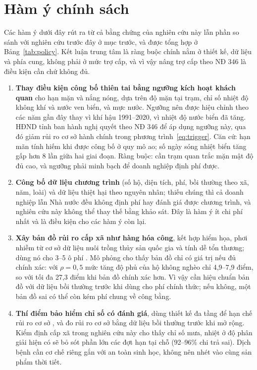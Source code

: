 \documentclass[12pt,a4paper]{article}
\begin{document}
\section{Hàm ý chính sách}
\label{sec:policy}

Các hàm ý dưới đây rút ra từ cả bằng chứng của nghiên cứu này lẫn phần so sánh với nghiên cứu trước đây ở mục trước, và được tổng hợp ở Bảng~\ref{tab:policy}. Kết luận trung tâm là ràng buộc chính nằm ở thiết kế, dữ liệu và phía cung, không phải ở mức trợ cấp, và vì vậy nâng trợ cấp theo NĐ 346 là điều kiện cần chứ không đủ.


\begin{enumerate}
\item \textbf{Thay điều kiện công bố thiên tai bằng ngưỡng kích hoạt khách quan} cho hạn mặn và nắng nóng, dựa trên độ mặn tại trạm, chỉ số nhiệt độ không khí và nước ven biển, và mực nước. Ngưỡng nên được hiệu chỉnh theo các năm gần đây thay vì khí hậu 1991--2020, vì nhiệt độ nước biển đã tăng. HĐND tỉnh ban hành nghị quyết theo NĐ 346 để áp dụng ngưỡng này, qua đó giảm rủi ro cơ sở hành chính trong phương trình~\eqref{eq:trigger}. Căn cứ: hạn mãn tính hiếm khi được công bố ở quy mô ao; số ngày sóng nhiệt biển tăng gấp hơn 8 lần giữa hai giai đoạn. Ràng buộc: cần trạm quan trắc mặn mật độ đủ cao, và ngưỡng phải minh bạch để doanh nghiệp định phí được.
\item \textbf{Công bố dữ liệu chương trình} (số hộ, diện tích, phí, bồi thường theo xã, năm, loài) và dữ liệu thiệt hại theo nguyên nhân; thiếu chúng thì cả doanh nghiệp lẫn Nhà nước đều không định phí hay đánh giá được chương trình, và nghiên cứu này không thể thay thế bằng khảo sát. Đây là hàm ý ít chi phí nhất và là điều kiện cho các hàm ý còn lại.
\item \textbf{Xây bản đồ rủi ro cấp xã như hàng hóa công}, kết hợp hiểm họa, phơi nhiễm từ cơ sở dữ liệu nuôi trồng thủy sản quốc gia \parencite{mae2026qd2120} và tính dễ tổn thương; dùng nó cho 3--5 ô phí \parencite{shirai2026drf,aguilar2018fao}. Mô phỏng cho thấy bản đồ chỉ có giá trị nếu đủ chính xác: với $\rho=0{,}5$ mức tăng độ phủ của hộ không nghèo chỉ 4,9--7,9 điểm, so với tối đa 27,3 điểm khi bản đồ chính xác hơn. Vì vậy cần hiệu chuẩn bản đồ với dữ liệu bồi thường trước khi dùng cho phí chính thức; nếu không, một bản đồ sai có thể còn kém phí chung về công bằng.
\item \textbf{Thí điểm bảo hiểm chỉ số có đánh giá}, dùng thiết kế đa tầng để hạn chế rủi ro cơ sở \parencite{elabed2013}, và đo rủi ro cơ sở bằng dữ liệu bồi thường trước khi mở rộng. Kiểm định cấp xã trong nghiên cứu này cho thấy chỉ số mưa, nhiệt ở độ phân giải hiện có sẽ bỏ sót phần lớn các đợt hạn tại chỗ (92--96\% chi trả sai). Dịch bệnh cần cơ chế riêng gắn với an toàn sinh học, không nên nhét vào cùng sản phẩm thời tiết.

\end{enumerate}
\end{document}
